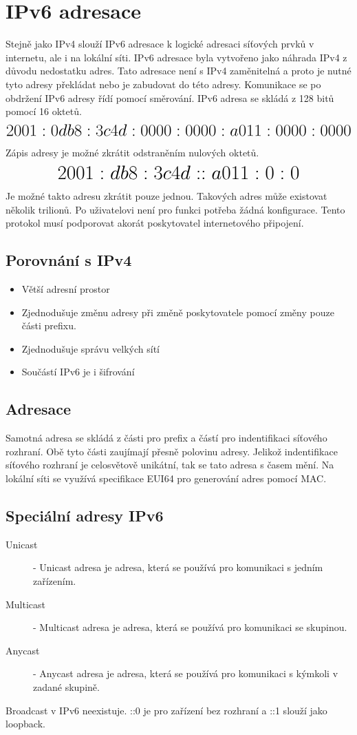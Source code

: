 \section{IPv6 adresace}
\label{sec:ipv6-adresace}
Stejně jako IPv4 slouží IPv6 adresace k logické adresaci síťových prvků v internetu, ale i na lokální síti.
IPv6 adresace byla vytvořeno jako náhrada IPv4 z důvodu nedostatku adres.
Tato adresace není s IPv4 zaměnitelná a proto je nutné tyto adresy překládat nebo je zabudovat do této adresy.
Komunikace se po obdržení IPv6 adresy řídí pomocí směrování.
IPv6 adresa se skládá z 128 bitů pomocí 16 oktetů.
\[\mathlarger{\mathlarger{\mathlarger{\mathlarger{2001:0db8:3c4d:0000:0000:a011:0000:0000}}}}\]
Zápis adresy je možné zkrátit odstraněním nulových oktetů.
\[\mathlarger{\mathlarger{\mathlarger{\mathlarger{2001:db8:3c4d::a011:0:0}}}}\]
Je možné takto adresu zkrátit pouze jednou.
Takových adres může existovat několik trilionů.
Po uživatelovi není pro funkci potřeba žádná konfigurace.
Tento protokol musí podporovat akorát poskytovatel internetového připojení.
\subsection{Porovnání s IPv4}
\begin{itemize}
  \item Větší adresní prostor
  \item Zjednodušuje změnu adresy při změně poskytovatele pomocí změny pouze části prefixu.
  \item Zjednodušuje správu velkých sítí
  \item Součástí IPv6 je i šifrování
\end{itemize}
\subsection{Adresace}
Samotná adresa se skládá z části pro prefix a částí pro indentifikaci síťového rozhraní.
Obě tyto části zaujímají přesně polovinu adresy.
Jelikož indentifikace síťového rozhraní je celosvětově unikátní, tak se tato adresa s časem mění.
Na lokální síti se využívá specifikace EUI64 pro generování adres pomocí MAC.
\subsection{Speciální adresy IPv6}
\begin{description}
  \item[Unicast]- Unicast adresa je adresa, která se používá pro komunikaci s jedním zařízením.
  \item[Multicast]- Multicast adresa je adresa, která se používá pro komunikaci se skupinou.
  \item[Anycast]- Anycast adresa je adresa, která se používá pro komunikaci s kýmkoli v zadané skupině.
\end{description}
Broadcast v IPv6 neexistuje. ::0 je pro zařízení bez rozhraní a ::1 slouží jako loopback.
